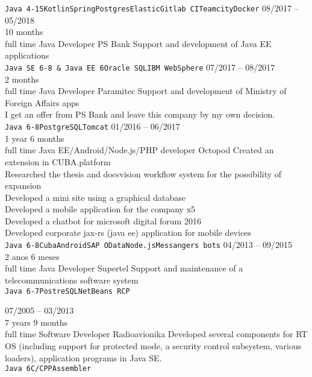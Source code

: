 \begin{entrylist}
{    \texttt{Java 4-15}\slashsep\texttt{Kotlin}\slashsep\texttt{Spring}\slashsep\texttt{Postgres}\slashsep\texttt{Elastic}\slashsep\texttt{Gitlab CI}\slashsep\texttt{Teamcity}\slashsep\texttt{Docker}}
    \entry
    {08/2017 -- 05/2018\\\footnotesize{10 months\\full time}}
    {Java Developer}
    {PS Bank}
    {
        Support and development of Java EE applications \\
        \texttt{Java SE 6-8 \& Java EE 6}\slashsep\texttt{Oracle SQL}\slashsep\texttt{IBM WebSphere}}
    \entry
    {07/2017 -- 08/2017\\\footnotesize{2 months\\full time}}
    {Java Developer}
    {Paramitec}
    {
        Support and development of Ministry of Foreign Affairs apps \\
        I get an offer from PS Bank and leave this company by my own decision. \\
        \texttt{Java 6-8}\slashsep\texttt{PostgreSQL}\slashsep\texttt{Tomcat}}
    \entry
    {01/2016 -- 06/2017\\\footnotesize{1 year 6 months\\full time}}
    {Java EE/Android/Node.js/PHP developer}
    {Octopod}
    {
        Created an extension in CUBA.platform \\
        Researched the thesis and docsvision workflow system for the possibility of expansion \\
        Developed a mini site using a graphical database \\
        Developed a mobile application for the company x5 \\
        Developed a chatbot for microsoft digital forum 2016 \\
        Developed corporate jax-rs (java ee) application for mobile devices\\
    \texttt{Java 6-8}\slashsep\texttt{Cuba}\slashsep\texttt{Android}\slashsep\texttt{SAP OData}\slashsep\texttt{Node.js}\slashsep\texttt{Messangers bots}}
    \entry
    {04/2013 -- 09/2015\\\footnotesize{2 anos 6 meses\\full time}}
    {Java Developer}
    {Supertel}
    {
        Support and maintenance of a telecommunications software system \\
        \texttt{Java 6-7}\slashsep\texttt{PostreSQL}\slashsep\texttt{NetBeans RCP}}

    \entry
    {07/2005 -- 03/2013\\\footnotesize{7 years 9 months\\full time}}
    {Software Developer}
    {Radioavionika}
    {
        Developed several components for RT OS (including support for protected mode, a security control subsystem, various loaders), application programs in Java SE. \\
    \texttt{Java 6}\slashsep\texttt{C/CPP}\slashsep\texttt{Assembler}}

\end{entrylist}

